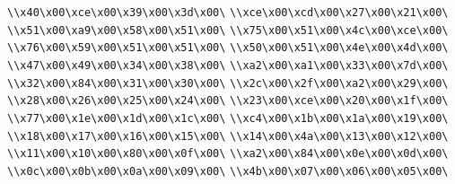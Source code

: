\verb|\\x40\x00\xce\x00\x39\x00\x3d\x00\|\newline
\verb|\\xce\x00\xcd\x00\x27\x00\x21\x00\|\newline
\verb|\\x51\x00\xa9\x00\x58\x00\x51\x00\|\newline
\verb|\\x75\x00\x51\x00\x4c\x00\xce\x00\|\newline
\verb|\\x76\x00\x59\x00\x51\x00\x51\x00\|\newline
\verb|\\x50\x00\x51\x00\x4e\x00\x4d\x00\|\newline
\verb|\\x47\x00\x49\x00\x34\x00\x38\x00\|\newline
\verb|\\xa2\x00\xa1\x00\x33\x00\x7d\x00\|\newline
\verb|\\x32\x00\x84\x00\x31\x00\x30\x00\|\newline
\verb|\\x2c\x00\x2f\x00\xa2\x00\x29\x00\|\newline
\verb|\\x28\x00\x26\x00\x25\x00\x24\x00\|\newline
\verb|\\x23\x00\xce\x00\x20\x00\x1f\x00\|\newline
\verb|\\x77\x00\x1e\x00\x1d\x00\x1c\x00\|\newline
\verb|\\xc4\x00\x1b\x00\x1a\x00\x19\x00\|\newline
\verb|\\x18\x00\x17\x00\x16\x00\x15\x00\|\newline
\verb|\\x14\x00\x4a\x00\x13\x00\x12\x00\|\newline
\verb|\\x11\x00\x10\x00\x80\x00\x0f\x00\|\newline
\verb|\\xa2\x00\x84\x00\x0e\x00\x0d\x00\|\newline
\verb|\\x0c\x00\x0b\x00\x0a\x00\x09\x00\|\newline
\verb|\\x4b\x00\x07\x00\x06\x00\x05\x00\|\newline
